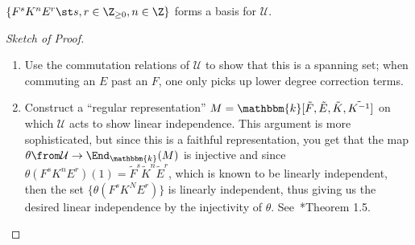 \documentclass[11pt,leqno,oneside]{amsbook}
\numberwithin{thm}{section}
\newcommand{\U}{\mathcal{U}}
\renewcommand{\k}{\mathbbm{k}}
\begin{document}
\begin{thm}
  \(\{F^sK^nE^r \st s,r \in \Z_{\geq 0}, n \in \Z\}\) forms a basis
  for \(\U\). 
\end{thm}
\begin{proof}[Sketch of Proof]
  \begin{enumerate}
  \item Use the commutation relations of \(\U\) to show that this is a
    spanning set; when commuting an \(E\) past an \(F\), one only
    picks up lower degree correction terms.
  \item Construct a ``regular representation'' \(M =
    \k[\tilde{F},\tilde{E},\tilde{K},\tilde{K^{-1}}]\) on which \(\U\) acts to show linear
    independence. This argument is more sophisticated, but since this
    is a faithful representation, you get that the map \(\theta \from \U
    \to \End_\k(M)\) is injective and since \(\theta(F^sK^nE^r)(1) =
    \tilde{F}^s\tilde{K}^n\tilde{E}^r\), which is known to be linearly
    independent, then the set \(\{\theta(F^s K^N E^r)\}\) is linearly
    independent, thus giving us the desired linear independence by the
    injectivity of \(\theta\). See~\cite{jantzen}*{Theorem 1.5}.
  \end{enumerate}
\end{proof}

\begin{bibdiv}
  \begin{biblist}
  \end{biblist}
\end{bibdiv}
\end{document}
